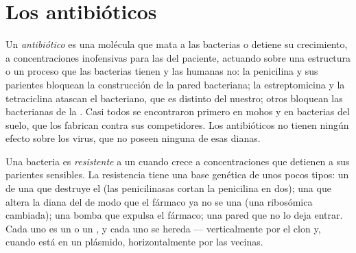 \section{Los antibióticos}

\begin{definition}[Antibiótico]\label{def:g11:antibiotic-resistance:antibiotic}
Un \emph{antibiótico} es una molécula que mata a las
bacterias o detiene su crecimiento, a concentraciones inofensivas para
las  del paciente, actuando sobre una estructura o un proceso
que las bacterias tienen y las  humanas no: la penicilina y sus
parientes bloquean la construcción de la pared bacteriana; la
estreptomicina y la tetraciclina atascan el  bacteriano, que es
distinto del nuestro; otros bloquean las  bacterianas de la
. Casi todos se encontraron primero en mohos y en
bacterias del suelo, que los fabrican contra sus competidores. Los
antibióticos no tienen ningún efecto sobre los virus, que no poseen
ninguna de esas dianas.
\end{definition}

\begin{proposition}\label{prop:g11:antibiotic-resistance:mechanisms}
Una bacteria es \emph{resistente}
a un  cuando crece a concentraciones que detienen a sus
parientes sensibles. La resistencia tiene una base genética de unos
pocos tipos: un  de una  que destruye el  (las
penicilinasas cortan la penicilina en dos); una  que altera la
diana del  de modo que el fármaco ya no se una (una 
ribosómica cambiada); una bomba que expulsa el fármaco; una pared que
no lo deja entrar. Cada uno es un  o un , y cada uno se hereda
--- verticalmente por el clon y, cuando está en un plásmido,
horizontalmente por las vecinas.
\end{proposition}
\admitted

